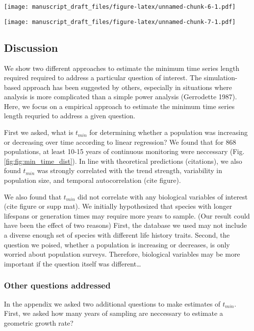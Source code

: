\documentclass[11pt,]{article}
\begin{document}
\texttt{[image: manuscript\_draft\_files/figure-latex/unnamed-chunk-6-1.pdf]}

\texttt{[image: manuscript\_draft\_files/figure-latex/unnamed-chunk-7-1.pdf]}

\subsection{Discussion}\label{discussion}

We show two different approaches to estimate the minimum time series
length required required to address a particular question of interest.
The simulation-based approach has been suggested by others, especially
in situations where analysis is more complicated than a simple power
analysis (Gerrodette 1987). Here, we focus on a empirical approach to
estimate the minimum time series length requried to address a given
question.

First we asked, what is \(t_{min}\) for determining whether a population
was increasing or decreasing over time according to linear regression?
We found that for 868 populations, at least 10-15 years of continuous
monitoring were neccessary (Fig. \ref{fig:fig:min_time_dist}). In line
with theoretical predictions (citations), we also found \(t_{min}\) was
strongly correlated with the trend strength, variability in population
size, and temporal autocorrelation (cite figure).

We also found that \(t_{min}\) did not correlate with any biological
variables of interest (cite figure or supp mat). We initially
hypothesized that species with longer lifespans or generation times may
require more years to sample. (Our result could have been the effect of
two reasons) First, the database we used may not include a diverse
enough set of species with different life history traits. Second, the
question we poised, whether a population is increasing or decreases, is
only worried about population surveys. Therefore, biological variables
may be more important if the question itself was different\ldots{}

\subsubsection{Other questions
addressed}\label{other-questions-addressed}

In the appendix we asked two additional questions to make estimates of
\(t_{min}\). First, we asked how many years of sampling are neccessary
to estimate a geometric growth rate?
\end{document}

